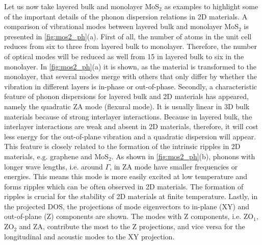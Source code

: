 Let us now take layered bulk and monolayer MoS$_2$ as examples to highlight some of the important details of the phonon dispersion relations in 2D materials. A comparison of vibrational modes between layered bulk and monolayer MoS$_2$ is presented in \autoref{fig:mos2_ph}(a). First of all, the number of atoms in the unit cell reduces from six to three from layered bulk to monolayer. Therefore, the number of optical modes will be reduced as well from 15 in layered bulk to six in the monolayer. In \autoref{fig:mos2_ph}(a) it is shown, as the material is transformed to the monolayer, that several modes merge with others that only differ by whether the vibration in different layers is in-phase or out-of-phase. Secondly, a characteristic feature of phonon dispersions for layered bulk and 2D materials has appeared, namely the quadratic ZA mode (flexural mode). It is usually linear in 3D bulk materials because of strong interlayer interactions. Because in layered bulk, the interlayer interactions are weak and absent in 2D materials, therefore, it will cost less energy for the out-of-plane vibration and a quadratic dispersion will appear\cite{kittel}. This feature is closely related to the formation of the intrinsic ripples in 2D materials, e.g. graphene\cite{neek} and MoS$_2$\cite{mos2-ripple}. As shown in \autoref{fig:mos2_ph}(b), phonons with longer wave lengths, i.e. around $\Gamma$, in ZA mode have smaller frequencies or energies. This means this mode is more easily excited at low temperature and forms ripples which can be often observed in 2D materials. The formation of ripples is crucial for the stability of 2D materials at finite temperature. Lastly, in the projected DOS, the projections of mode eigenvectors to in-plane (XY) and out-of-plane (Z) components are shown. The modes with Z components, i.e. ZO$_1$, ZO$_2$ and ZA, contribute the most to the Z projections, and vice versa for the longitudinal and acoustic modes to the XY projection. 

